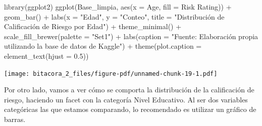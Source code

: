 \documentclass[
  letterpaper,
  DIV=11,
  numbers=noendperiod]{scrreprt}
\newenvironment{Shaded}{\begin{snugshade}}{\end{snugshade}}
\newcommand{\AttributeTok}[1]{\textcolor[rgb]{0.40,0.45,0.13}{#1}}
\newcommand{\FloatTok}[1]{\textcolor[rgb]{0.68,0.00,0.00}{#1}}
\newcommand{\FunctionTok}[1]{\textcolor[rgb]{0.28,0.35,0.67}{#1}}
\newcommand{\NormalTok}[1]{\textcolor[rgb]{0.00,0.23,0.31}{#1}}
\newcommand{\SpecialCharTok}[1]{\textcolor[rgb]{0.37,0.37,0.37}{#1}}
\newcommand{\StringTok}[1]{\textcolor[rgb]{0.13,0.47,0.30}{#1}}
\begin{document}
\begin{Shaded}
\begin{Highlighting}[]
\FunctionTok{library}\NormalTok{(ggplot2)}
\FunctionTok{ggplot}\NormalTok{(Base\_limpia, }\FunctionTok{aes}\NormalTok{(}\AttributeTok{x =}\NormalTok{ Age, }\AttributeTok{fill =} \StringTok{\textasciigrave{}}\AttributeTok{Risk Rating}\StringTok{\textasciigrave{}}\NormalTok{)) }\SpecialCharTok{+}
  \FunctionTok{geom\_bar}\NormalTok{() }\SpecialCharTok{+}  
  \FunctionTok{labs}\NormalTok{(}\AttributeTok{x =} \StringTok{"Edad"}\NormalTok{, }\AttributeTok{y =} \StringTok{"Conteo"}\NormalTok{, }\AttributeTok{title =} \StringTok{"Distribución de Calificación de Riesgo por Edad"}\NormalTok{) }\SpecialCharTok{+} 
  \FunctionTok{theme\_minimal}\NormalTok{() }\SpecialCharTok{+}  
  \FunctionTok{scale\_fill\_brewer}\NormalTok{(}\AttributeTok{palette =} \StringTok{"Set1"}\NormalTok{)  }\SpecialCharTok{+}
  \FunctionTok{labs}\NormalTok{(}\AttributeTok{caption =} \StringTok{"Fuente: Elaboración propia utilizando la base de datos de Kaggle"}\NormalTok{) }\SpecialCharTok{+}
\FunctionTok{theme}\NormalTok{(}\AttributeTok{plot.caption =} \FunctionTok{element\_text}\NormalTok{(}\AttributeTok{hjust =} \FloatTok{0.5}\NormalTok{)) }
\end{Highlighting}
\end{Shaded}

\texttt{[image: bitacora\_2\_files/figure-pdf/unnamed-chunk-19-1.pdf]}

Por otro lado, vamos a ver cómo se comporta la distribución de la
calificación de riesgo, haciendo un facet con la categoría Nivel
Educativo. Al ser dos variables categóricas las que estamos comparando,
lo recomendado es utilizar un gráfico de barras.
\end{document}
